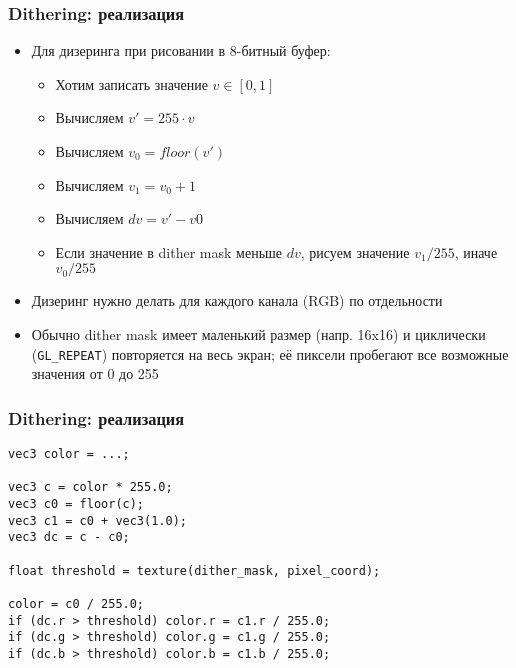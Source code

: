 \documentclass{beamer}
\begin{document}
\begin{frame}[fragile]
\frametitle{Dithering: реализация}
\begin{itemize}
\item Для дизеринга при рисовании в 8-битный буфер:
\begin{itemize}
\item Хотим записать значение \begin{math}v \in [0, 1]\end{math}
\item Вычисляем \begin{math}v' = 255 \cdot v\end{math}
\item Вычисляем \begin{math}v_0 = floor(v')\end{math}
\item Вычисляем \begin{math}v_1 = v_0 + 1\end{math}
\item Вычисляем \begin{math}dv = v' - v0\end{math}
\item Если значение в dither mask меньше \begin{math}dv\end{math}, рисуем значение \begin{math}v_1 / 255\end{math}, иначе \begin{math}v_0 / 255\end{math}
\end{itemize}
\pause
\item Дизеринг нужно делать для каждого канала (RGB) по отдельности
\pause
\item Обычно dither mask имеет маленький размер (напр. 16x16) и циклически (\verb|GL_REPEAT|) повторяется на весь экран; её пиксели пробегают все возможные значения от 0 до 255
\end{itemize}
\end{frame}

\begin{frame}[fragile]
\fontsize{10pt}{10pt}
\frametitle{Dithering: реализация}
\begin{verbatim}
vec3 color = ...;

vec3 c = color * 255.0;
vec3 c0 = floor(c);
vec3 c1 = c0 + vec3(1.0);
vec3 dc = c - c0;

float threshold = texture(dither_mask, pixel_coord);

color = c0 / 255.0;
if (dc.r > threshold) color.r = c1.r / 255.0;
if (dc.g > threshold) color.g = c1.g / 255.0;
if (dc.b > threshold) color.b = c1.b / 255.0;
\end{verbatim}
\end{frame}
\end{document}
